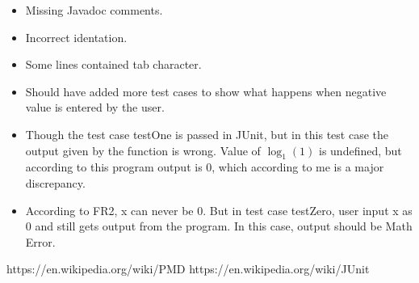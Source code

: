\documentclass{article}
\begin{document}
\begin{itemize}
   \item Missing Javadoc comments.
   \item Incorrect identation.
   \item Some lines contained tab character. 
   \item Should have added more test cases to show what happens when negative value is entered by the user.
   \item Though the test case testOne is passed in JUnit, but in this test case the output given by the function is wrong. Value of $\log_{1} (1)$ is undefined, but according to this program output is 0, which according to me is a major discrepancy.
   \item According to FR2, x can never be 0. But in test case testZero, user input x as 0 and still gets output from the program. In this case, output should be Math Error.
\end{itemize}



 
 

\begin{thebibliography}{}

{https://en.wikipedia.org/wiki/PMD}
{https://en.wikipedia.org/wiki/JUnit}

\end{thebibliography}
\end{document}

